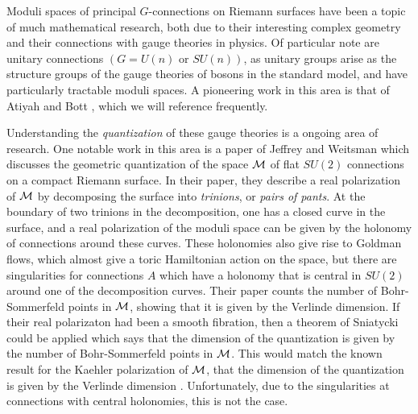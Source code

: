 

	Moduli spaces of principal $G$-connections on Riemann surfaces have been a topic of much mathematical research, both due to their interesting complex geometry and their connections with gauge theories in physics. Of particular note are unitary connections $(G=U(n) \text{ or }SU(n))$, as unitary groups arise as the structure groups of the gauge theories of bosons in the standard model, and have particularly tractable moduli spaces. A pioneering work in this area is that of Atiyah and Bott \cite{atiyah_yang-mills_1983}, which we will reference frequently. 
	
	Understanding the \emph{quantization} of these gauge theories is a ongoing area of research. One notable work in this area is a paper of Jeffrey and Weitsman \cite{jeffrey_bohr-sommerfeld_1992} which discusses the geometric quantization of the space $\mathcal{M}$ of flat $SU(2)$ connections on a compact Riemann surface. In their paper, they describe a real polarization of $\mathcal{M}$ by decomposing the surface into \textit{trinions}, or \textit{pairs of pants}. At the boundary of two trinions in the decomposition, one has a closed curve in the surface, and a real polarization of the moduli space can be given by the holonomy of connections around these curves. These holonomies also give rise to Goldman flows, which almost give a toric Hamiltonian action on the space, but there are singularities for connections $A$ which have a holonomy that is central in $SU(2)$ around one of the decomposition curves. Their paper counts the number of Bohr-Sommerfeld points in $\mathcal{M}$, showing that it is given by the Verlinde dimension. If their real polarizaton had been a smooth fibration, then a theorem of Sniatycki could be applied which says that the dimension of the quantization is given by the number of Bohr-Sommerfeld points in $\mathcal{M}$. This would match the known result for the Kaehler polarization of $\mathcal{M}$, that the dimension of the quantization is given by the Verlinde dimension \cite{faltings_proof_1994}. Unfortunately, due to the singularities at connections with central holonomies, this is not the case.
	
